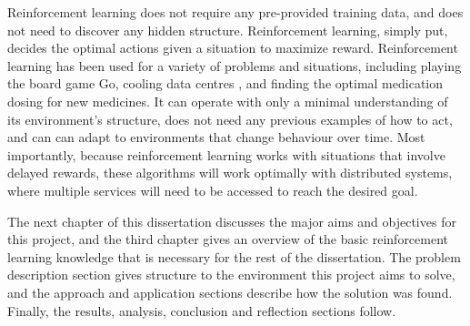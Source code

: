 Reinforcement learning does not require any pre-provided training data, and does not need to discover any hidden structure. Reinforcement learning, simply put, decides the optimal actions given a situation to maximize reward. Reinforcement learning has been used for a variety of problems and situations, including playing the board game Go\cite{Silver2017}, cooling data centres \cite{DBLP:journals/corr/abs-1709-05077}, and finding the optimal medication dosing for new medicines\cite{7591355}. It can operate with only a minimal understanding of its environment's structure, does not need any previous examples of how to act, and can can adapt to environments that change behaviour over time. Most importantly, because reinforcement learning works with situations that involve delayed rewards, these algorithms will work optimally with distributed systems, where multiple services will need to be accessed to reach the desired goal.

The next chapter of this dissertation discusses the major aims and objectives for this project, and the third chapter gives an overview of the basic reinforcement learning knowledge that is necessary for the rest of the dissertation. The problem description section gives structure to the environment this project aims to solve, and the approach and application sections describe how the solution was found. Finally, the results, analysis, conclusion and reflection sections follow.






